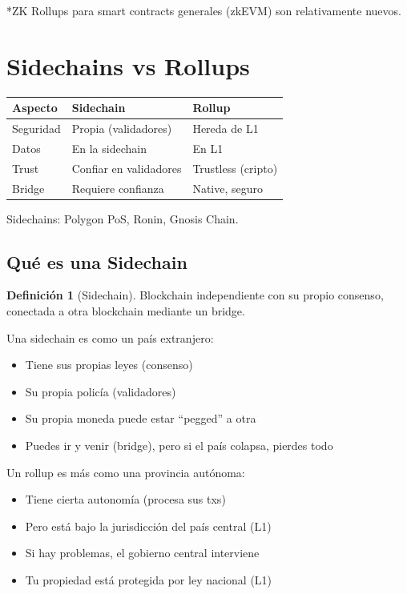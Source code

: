 \documentclass[11pt,a4paper,twoside,openright]{book}
\theoremstyle{definition}
\newtheorem{definition}{Definición}[chapter]
\theoremstyle{plain}
\theoremstyle{remark}
\begin{document}
*ZK Rollups para smart contracts generales (zkEVM) son relativamente nuevos.

\section{Sidechains vs Rollups}

\begin{table}[htbp]
\centering
\begin{tabular}{lll}
\toprule
\textbf{Aspecto} & \textbf{Sidechain} & \textbf{Rollup} \\
\midrule
Seguridad & Propia (validadores) & Hereda de L1 \\
Datos & En la sidechain & En L1 \\
Trust & Confiar en validadores & Trustless (cripto) \\
Bridge & Requiere confianza & Native, seguro \\
\bottomrule
\end{tabular}
\end{table}

Sidechains: Polygon PoS, Ronin, Gnosis Chain.

\subsection{Qué es una Sidechain}

\begin{definition}[Sidechain]
Blockchain independiente con su propio consenso, conectada a otra blockchain mediante un bridge.
\end{definition}

\begin{intuicion}
Una sidechain es como un país extranjero:
\begin{itemize}
    \item Tiene sus propias leyes (consenso)
    \item Su propia policía (validadores)
    \item Su propia moneda puede estar ``pegged'' a otra
    \item Puedes ir y venir (bridge), pero si el país colapsa, pierdes todo
\end{itemize}

Un rollup es más como una provincia autónoma:
\begin{itemize}
    \item Tiene cierta autonomía (procesa sus txs)
    \item Pero está bajo la jurisdicción del país central (L1)
    \item Si hay problemas, el gobierno central interviene
    \item Tu propiedad está protegida por ley nacional (L1)
\end{itemize}
\end{intuicion}
\end{document}

